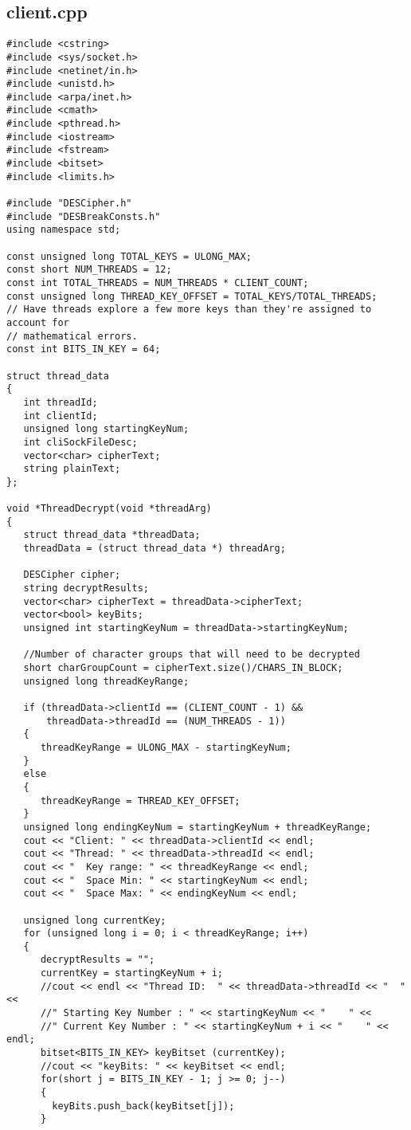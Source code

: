 \documentclass[11pt]{article}
\begin{document}
\subsection{client.cpp}
\begin{verbatim}
#include <cstring>
#include <sys/socket.h>
#include <netinet/in.h>
#include <unistd.h>
#include <arpa/inet.h>
#include <cmath>
#include <pthread.h>
#include <iostream>
#include <fstream>
#include <bitset>
#include <limits.h>

#include "DESCipher.h"
#include "DESBreakConsts.h"
using namespace std;

const unsigned long TOTAL_KEYS = ULONG_MAX;
const short NUM_THREADS = 12;
const int TOTAL_THREADS = NUM_THREADS * CLIENT_COUNT;
const unsigned long THREAD_KEY_OFFSET = TOTAL_KEYS/TOTAL_THREADS;
// Have threads explore a few more keys than they're assigned to account for
// mathematical errors.
const int BITS_IN_KEY = 64;

struct thread_data
{
   int threadId;
   int clientId;
   unsigned long startingKeyNum;
   int cliSockFileDesc;
   vector<char> cipherText;
   string plainText;
};

void *ThreadDecrypt(void *threadArg)
{
   struct thread_data *threadData;
   threadData = (struct thread_data *) threadArg;

   DESCipher cipher;
   string decryptResults;
   vector<char> cipherText = threadData->cipherText;
   vector<bool> keyBits;
   unsigned int startingKeyNum = threadData->startingKeyNum;

   //Number of character groups that will need to be decrypted
   short charGroupCount = cipherText.size()/CHARS_IN_BLOCK;
   unsigned long threadKeyRange;

   if (threadData->clientId == (CLIENT_COUNT - 1) &&
       threadData->threadId == (NUM_THREADS - 1))
   {
      threadKeyRange = ULONG_MAX - startingKeyNum;
   }
   else
   {
      threadKeyRange = THREAD_KEY_OFFSET;
   }
   unsigned long endingKeyNum = startingKeyNum + threadKeyRange;
   cout << "Client: " << threadData->clientId << endl;
   cout << "Thread: " << threadData->threadId << endl;
   cout << "  Key range: " << threadKeyRange << endl;
   cout << "  Space Min: " << startingKeyNum << endl;
   cout << "  Space Max: " << endingKeyNum << endl;

   unsigned long currentKey;
   for (unsigned long i = 0; i < threadKeyRange; i++)
   {
      decryptResults = "";
      currentKey = startingKeyNum + i;
      //cout << endl << "Thread ID:  " << threadData->threadId << "  " <<
      //" Starting Key Number : " << startingKeyNum << "    " <<
      //" Current Key Number : " << startingKeyNum + i << "    " << endl;
      bitset<BITS_IN_KEY> keyBitset (currentKey);
      //cout << "keyBits: " << keyBitset << endl;
      for(short j = BITS_IN_KEY - 1; j >= 0; j--)
      {
        keyBits.push_back(keyBitset[j]);
      }


\end{verbatim}
\end{document}
